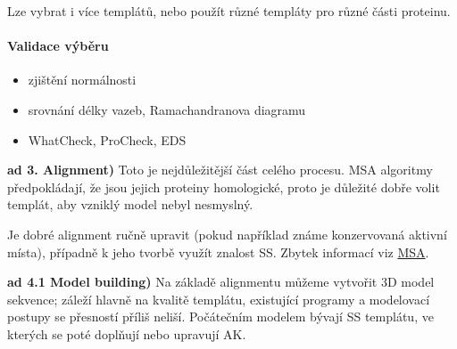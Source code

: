 \documentclass[DIV=8]{scrreprt}
\begin{document}
Lze vybrat i více templátů, nebo použít různé templáty pro různé části proteinu.

\paragraph{Validace výběru}
\begin{itemize}[nosep]
    \item zjištění normálnosti
    \item srovnání délky vazeb, Ramachandranova diagramu
    \item WhatCheck, ProCheck, EDS
\end{itemize}



\textbf{ad 3. Alignment)} Toto je nejdůležitější část celého procesu. MSA algoritmy předpokládají, že jsou jejich proteiny homologické, proto je důležité dobře volit templát, aby vzniklý model nebyl nesmyslný.

Je dobré alignment ručně upravit (pokud například známe konzervovaná aktivní místa), případně k jeho tvorbě využít znalost SS. Zbytek informací viz \href{Multiple sequence alignment}{MSA}.

\textbf{ad 4.1 Model building)} Na základě alignmentu můžeme vytvořit 3D model sekvence; záleží hlavně na kvalitě templátu, existující programy a modelovací postupy se přesností příliš neliší. Počátečním modelem bývají SS templátu, ve kterých se poté doplňují nebo upravují AK.
\end{document}
